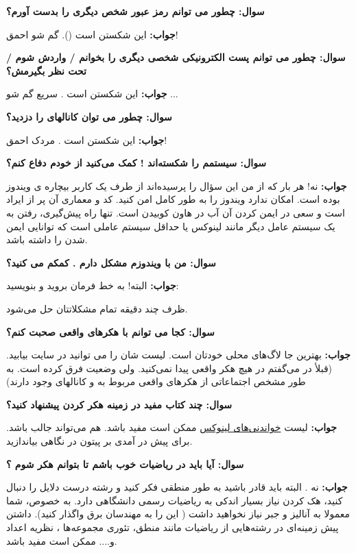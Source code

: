 \textbf{سوال:  چطور می توانم رمز عبور شخص دیگری را بدست آورم؟}

\textbf{جواب:}
 این شکستن است ().
 گم شو احمق!
 
\textbf{سوال:  چطور می توانم پست الکترونیکی شخصی دیگری را بخوانم / واردش شوم / تحت نظر بگیرمش؟}

\textbf{جواب:}
این شکستن است . سریع گم شو ...

\textbf{سوال:  چطور می توان کانالهای  را دزدید؟}

\textbf{جواب:}
 این شکستن است . مردک احمق!
 
\textbf{سوال:  سیستمم را شکسته‌اند ! کمک می‌کنید از خودم دفاع کنم؟}

\textbf{جواب:} 
نه! هر بار که از من این سؤال را پرسیده‌اند از طرف یک کاربر بیچاره ی ویندوز بوده است. امکان ندارد ویندوز را به طور کامل امن کنید. کد و معماری آن پر از ایراد است و سعی در ایمن کردن آن آب در هاون کوبیدن است. تنها راه پیش‌گیری، رفتن به یک سیستم عامل دیگر مانند لینوکس یا حداقل سیستم عاملی است که توانایی ایمن شدن را داشته باشد.

\textbf{سوال:  من با ویندوزم مشکل دارم . کمکم می کنید؟}

\textbf{جواب:}
 البته! به خط فرمان بروید و بنویسید:
\begin{flushleft}
\end{flushleft}

 ظرف چند دقیقه تمام مشکلاتتان حل می‌شود.
 
\textbf{سوال:  کجا می توانم با هکرهای واقعی صحبت کنم؟}

\textbf{جواب:}
 بهترین جا لاگ‌های محلی خودتان است. لیست شان را می توانید در سایت
بیابید.
(قبلأ در  می‌گفتم در 
 هیچ هکر واقعی پیدا نمی‌کنید. ولی وضعیت فرق کرده است. به طور مشخص اجتماعاتی از هکرهای واقعی مربوط به 
 و 
 کانالهای 
 وجود دارند)
 
\textbf{سوال:  چند کتاب مفید در زمینه هکر کردن پیشنهاد کنید؟}

\textbf{جواب:}
لیست
\href{http://en.tldp.org/HOWTO/Reading-List-HOWTO/index.html}{خواندنی‌های لینوکس}
ممکن است مفید باشد.
\href{http://www.catb.org/~esr/faqs/loginataka.html}{}
هم می‌تواند جالب باشد. برای پیش در آمدی بر پیتون در 
\href{http://www.python.org/doc/Intros.html}{}
نگاهی بیاندازید.

\textbf{سوال:  آیا باید در ریاضیات خوب باشم تا بتوانم هکر شوم ؟}

\textbf{جواب:} 
نه . البته باید قادر باشید به طور منطقی فکر کنید و رشته درست دلایل را دنبال کنید، هک کردن نیاز بسیار اندکی به ریاضیات رسمی دانشگاهی دارد. به خصوص، شما معمولا به آنالیز و جبر نیاز نخواهید داشت ( این را به مهندسان برق واگذار کنید). داشتن پیش زمینه‌ای در رشته‌هایی از ریاضیات مانند منطق، تئوری مجموعه‌ها ، نظریه اعداد و.... ممکن است مفید باشد.


